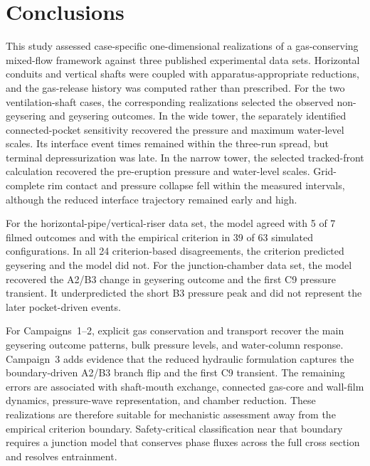 \section{Conclusions}
\label{sec:conclusions}

This study assessed case-specific one-dimensional realizations of a
gas-conserving mixed-flow framework against three published experimental data
sets. Horizontal conduits and vertical shafts were coupled with
apparatus-appropriate reductions, and the gas-release history was computed rather than
prescribed. For the two ventilation-shaft cases, the corresponding realizations selected the
observed non-geysering and geysering outcomes. In the wide tower, the separately
identified connected-pocket sensitivity recovered the pressure and maximum
water-level scales. Its interface event times remained within the three-run
spread, but terminal depressurization was late. In the narrow tower, the
selected tracked-front calculation recovered the pre-eruption pressure and
water-level scales. Grid-complete rim contact and pressure collapse fell within
the measured intervals, although the reduced interface trajectory remained
early and high.

For the horizontal-pipe/vertical-riser data set, the model agreed with 5 of 7
filmed outcomes and with the empirical criterion in 39 of 63 simulated
configurations. In all 24 criterion-based disagreements, the criterion
predicted geysering and the model did not. For the junction-chamber data set,
the model recovered the A2/B3 change in geysering outcome and the first C9
pressure transient. It underpredicted the short B3 pressure peak and did not
represent the later pocket-driven events.

For Campaigns~1--2, explicit gas conservation and transport recover the main
geysering outcome patterns, bulk pressure levels, and water-column response.
Campaign~3 adds evidence that the reduced hydraulic formulation captures the
boundary-driven A2/B3 branch flip and the first C9 transient. The remaining
errors are associated with shaft-mouth exchange,
connected gas-core and wall-film dynamics, pressure-wave representation, and
chamber reduction. These realizations are therefore suitable for mechanistic assessment
away from the empirical criterion boundary. Safety-critical classification
near that boundary requires a junction model that conserves phase fluxes across
the full cross section and resolves entrainment.
